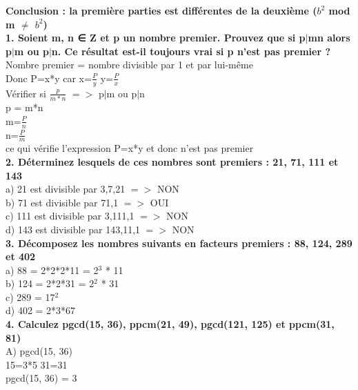 \textbf{Conclusion : la première parties est différentes de la deuxième ($b^{2}$ mod m $\ne$ $b^{2}$) } \\

\newpage
\textbf{1. Soient m, n ∈ Z et p un nombre premier. Prouvez que si p$|$mn alors p$|$m ou p$|$n. Ce résultat est-il toujours vrai si p n’est pas premier ?} \\

Nombre premier = nombre divisible par 1 et par lui-même \\

Donc P=x*y car x=$\frac{P}{y}$ y=$\frac{P}{x}$ \\

Vérifier si $\frac{p}{m*n}$ $=>$  p$|$m ou p$|$n \\

p = m*n \\
m=$\frac{P}{n}$ \\
n=$\frac{P}{m}$ \\

ce qui vérifie l'expression P=x*y et donc n'est pas premier \\

\textbf{2. Déterminez lesquels de ces nombres sont premiers : 21, 71, 111 et 143} \\

a) 21 est divisible par 3,7,21 $=>$ NON \\
b) 71 est divisible par 71,1 $=>$ OUI  \\
c) 111 est divisible par 3,111,1 $=>$ NON  \\
d) 143 est divisible par 143,11,1 $=>$ NON \\

\textbf{3. Décomposez les nombres suivants en facteurs premiers : 88, 124, 289 et 402} \\

a) 88 = 2*2*2*11 = 2$^{3}$ * 11 \\
b) 124 = 2*2*31 = 2$^{2}$ * 31 \\
c) 289 = 17$^{2}$ \\
d) 402 = 2*3*67 \\

\textbf{4. Calculez pgcd(15, 36), ppcm(21, 49), pgcd(121, 125) et ppcm(31, 81)} \\

A) pgcd(15, 36)\\

15=3*5 31=31 \\
pgcd(15, 36) = 3 \\


